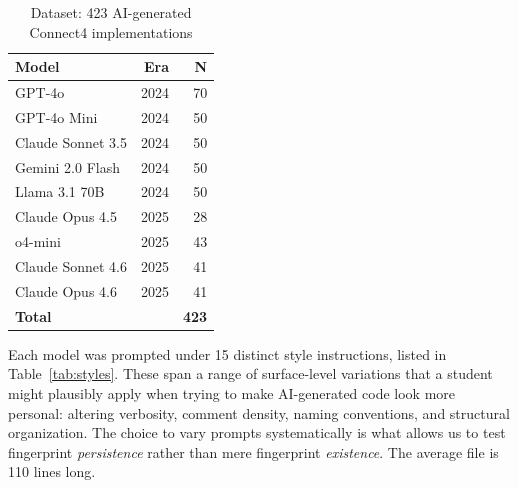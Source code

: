 \documentclass[sigconf]{acmart}
\begin{document}
\begin{table}[h]
\caption{Dataset: 423 AI-generated Connect4 implementations}
\label{tab:dataset}
\begin{tabular}{lrr}
\toprule
Model & Era & N \\
\midrule
GPT-4o            & 2024 & 70 \\
GPT-4o Mini       & 2024 & 50 \\
Claude Sonnet 3.5 & 2024 & 50 \\
Gemini 2.0 Flash  & 2024 & 50 \\
Llama 3.1 70B     & 2024 & 50 \\
Claude Opus 4.5   & 2025 & 28 \\
o4-mini           & 2025 & 43 \\
Claude Sonnet 4.6 & 2025 & 41 \\
Claude Opus 4.6   & 2025 & 41 \\
\midrule
\textbf{Total}    &      & \textbf{423} \\
\bottomrule
\end{tabular}
\end{table}

Each model was prompted under 15 distinct style instructions, listed in Table~\ref{tab:styles}. These span a range of surface-level variations that a student might plausibly apply when trying to make AI-generated code look more personal: altering verbosity, comment density, naming conventions, and structural organization. The choice to vary prompts systematically is what allows us to test fingerprint \emph{persistence} rather than mere fingerprint \emph{existence}. The average file is 110 lines long.
\end{document}
